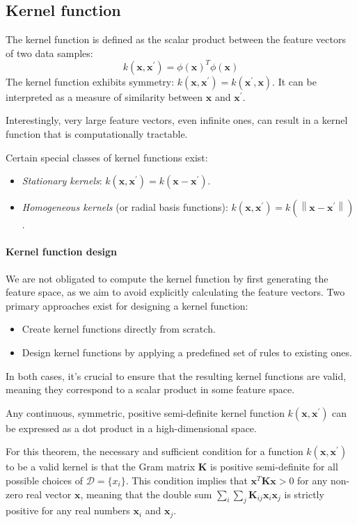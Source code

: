 \subsection{Kernel function}
The kernel function is defined as the scalar product between the feature vectors of two data samples:
\[k(\textbf{x},\textbf{x}^\prime)=\phi(\textbf{x})^T\phi(\textbf{x})\]
The kernel function exhibits symmetry: $k(\textbf{x},\textbf{x}^\prime)=k(\textbf{x}^\prime,\textbf{x})$.
It can be interpreted as a measure of similarity between $\textbf{x}$ and $\textbf{x}^\prime$.

Interestingly, very large feature vectors, even infinite ones, can result in a kernel function that is computationally tractable.

Certain special classes of kernel functions exist:
\begin{itemize}
    \item \textit{Stationary kernels}: $k(\textbf{x},\textbf{x}^\prime)=k(\textbf{x}-\textbf{x}^\prime)$.
    \item \textit{Homogeneous kernels} (or radial basis functions): $k(\textbf{x},\textbf{x}^\prime)=k(\left\lVert \textbf{x}-\textbf{x}^\prime\right\rVert )$.
\end{itemize}

\paragraph*{Kernel function design}
We are not obligated to compute the kernel function by first generating the feature space, as we aim to avoid explicitly calculating the feature vectors.
Two primary approaches exist for designing a kernel function:
\begin{itemize}
    \item Create kernel functions directly from scratch.
    \item Design kernel functions by applying a predefined set of rules to existing ones.
\end{itemize}
In both cases, it's crucial to ensure that the resulting kernel functions are valid, meaning they correspond to a scalar product in some feature space.
\begin{theorem}[Mercer]
    Any continuous, symmetric, positive semi-definite kernel function $k(\textbf{x},\textbf{x}^\prime)$ can be expressed as a dot product in a high-dimensional space. 
\end{theorem}
For this theorem, the necessary and sufficient condition for a function $k(\textbf{x},\textbf{x}^\prime)$ to be a valid kernel is that the Gram matrix $\textbf{K}$ is positive semi-definite for all possible choices of $\mathcal{D}=\{x_i\}$.
This condition implies that $\textbf{x}^T\textbf{K}\textbf{x}>0$ for any non-zero real vector $\textbf{x}$, meaning that the double sum $\sum_i\sum_j\textbf{K}_{ij}\textbf{x}_i\textbf{x}_j$ is strictly positive for any real numbers $\textbf{x}_i$ and $\textbf{x}_j$.

